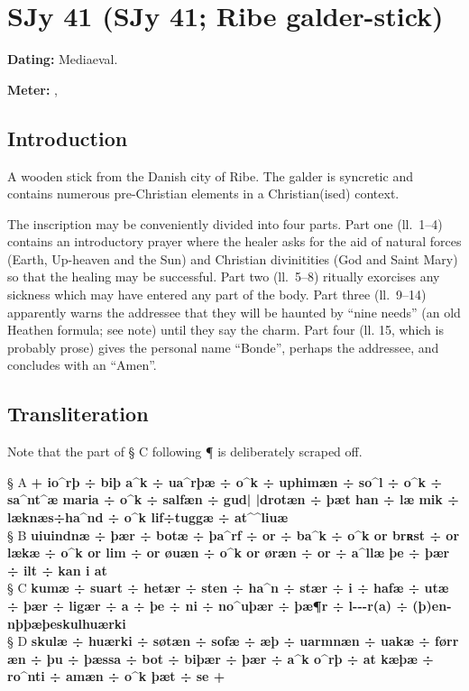 \section{SJy 41 (SJy 41; Ribe galder-stick)}\chapterStart{}%

\begin{flushright}%
\textbf{Dating:} Mediaeval.%

\textbf{Meter:} \Fornyrdislag, \Galdralag
\end{flushright}%

\subsection{Introduction}

A wooden stick from the Danish city of Ribe.  The galder is syncretic and contains numerous pre-Christian elements in a Christian(ised) context.

The inscription may be conveniently divided into four parts.  Part one (ll.~1--4) contains an introductory prayer where the healer asks for the aid of natural forces (Earth, Up-heaven and the Sun) and Christian divinitities (God and Saint Mary) so that the healing may be successful.  Part two (ll.~5--8) ritually exorcises any sickness which may have entered any part of the body.  Part three (ll.~9--14) apparently warns the addressee that they will be haunted by “nine needs” (an old Heathen formula; see note) until they say the charm.  Part four (ll. 15, which is probably prose) gives the personal name “Bonde”, perhaps the addressee, and concludes with an “Amen”.

\subsection{Transliteration}

Note that the part of § C following ¶ is deliberately scraped off.

§ A \textbf{+ io\textasciicircum rþ ÷ biþ a\textasciicircum k ÷ ua\textasciicircum rþæ ÷ o\textasciicircum k ÷ uphimæn ÷ so\textasciicircum l ÷ o\textasciicircum k ÷ sa\textasciicircum nt\textasciicircum æ maria ÷ o\textasciicircum k ÷ salfæn ÷ gud| |drotæn ÷ þæt han ÷ læ mik ÷ læknæs÷ha\textasciicircum nd ÷ o\textasciicircum k lif÷tuggæ ÷ at\textasciicircum  \textasciicircum liuæ} \\
§ B \textbf{uiuindnæ ÷ þær ÷ botæ ÷ þa\textasciicircum rf ÷ or ÷ ba\textasciicircum k ÷ o\textasciicircum k or brʀst ÷ or lækæ ÷ o\textasciicircum k or lim ÷ or øuæn ÷ o\textasciicircum k or øræn ÷ or ÷ a\textasciicircum llæ þe ÷ þær ÷ ilt ÷ kan i at} \\
§ C \textbf{kumæ ÷ suart ÷ hetær ÷ sten ÷ ha\textasciicircum n ÷ stær ÷ i ÷ hafæ ÷ utæ ÷ þær ÷ ligær ÷ a ÷ þe ÷ ni ÷ no\textasciicircum uþær ÷ þæ¶r ÷ l-{}-{}-r(a) ÷ (þ)en-nþþæþeskulhuærki} \\
§ D \textbf{skulæ ÷ huærki ÷ søtæn ÷ sofæ ÷ æþ ÷ uarmnæn ÷ uakæ ÷ førr æn ÷ þu ÷ þæssa ÷ bot ÷ biþær ÷ þær ÷ a\textasciicircum k o\textasciicircum rþ ÷ at kæþæ ÷ ro\textasciicircum nti ÷ amæn ÷ o\textasciicircum k þæt ÷ se +}

